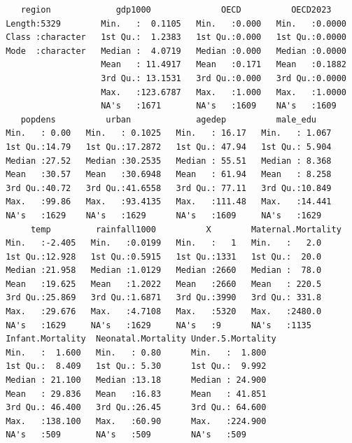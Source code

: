 \documentclass[
  letterpaper,
  DIV=11,
  numbers=noendperiod]{scrartcl}
\begin{document}
\begin{verbatim}
    region             gdp1000              OECD          OECD2023     
 Length:5329        Min.   :  0.1105   Min.   :0.000   Min.   :0.0000  
 Class :character   1st Qu.:  1.2383   1st Qu.:0.000   1st Qu.:0.0000  
 Mode  :character   Median :  4.0719   Median :0.000   Median :0.0000  
                    Mean   : 11.4917   Mean   :0.171   Mean   :0.1882  
                    3rd Qu.: 13.1531   3rd Qu.:0.000   3rd Qu.:0.0000  
                    Max.   :123.6787   Max.   :1.000   Max.   :1.0000  
                    NA's   :1671       NA's   :1609    NA's   :1609    
    popdens          urban             agedep          male_edu     
 Min.   : 0.00   Min.   : 0.1025   Min.   : 16.17   Min.   : 1.067  
 1st Qu.:14.79   1st Qu.:17.2872   1st Qu.: 47.94   1st Qu.: 5.904  
 Median :27.52   Median :30.2535   Median : 55.51   Median : 8.368  
 Mean   :30.57   Mean   :30.6948   Mean   : 61.94   Mean   : 8.258  
 3rd Qu.:40.72   3rd Qu.:41.6558   3rd Qu.: 77.11   3rd Qu.:10.849  
 Max.   :99.86   Max.   :93.4135   Max.   :111.48   Max.   :14.441  
 NA's   :1629    NA's   :1629      NA's   :1609     NA's   :1629    
      temp         rainfall1000          X        Maternal.Mortality
 Min.   :-2.405   Min.   :0.0199   Min.   :   1   Min.   :   2.0    
 1st Qu.:12.928   1st Qu.:0.5915   1st Qu.:1331   1st Qu.:  20.0    
 Median :21.958   Median :1.0129   Median :2660   Median :  78.0    
 Mean   :19.625   Mean   :1.2022   Mean   :2660   Mean   : 220.5    
 3rd Qu.:25.869   3rd Qu.:1.6871   3rd Qu.:3990   3rd Qu.: 331.8    
 Max.   :29.676   Max.   :4.7108   Max.   :5320   Max.   :2480.0    
 NA's   :1629     NA's   :1629     NA's   :9      NA's   :1135      
 Infant.Mortality  Neonatal.Mortality Under.5.Mortality
 Min.   :  1.600   Min.   : 0.80      Min.   :  1.800  
 1st Qu.:  8.409   1st Qu.: 5.30      1st Qu.:  9.992  
 Median : 21.100   Median :13.18      Median : 24.900  
 Mean   : 29.836   Mean   :16.83      Mean   : 41.851  
 3rd Qu.: 46.400   3rd Qu.:26.45      3rd Qu.: 64.600  
 Max.   :138.100   Max.   :60.90      Max.   :224.900  
 NA's   :509       NA's   :509        NA's   :509      
\end{verbatim}
\end{document}
